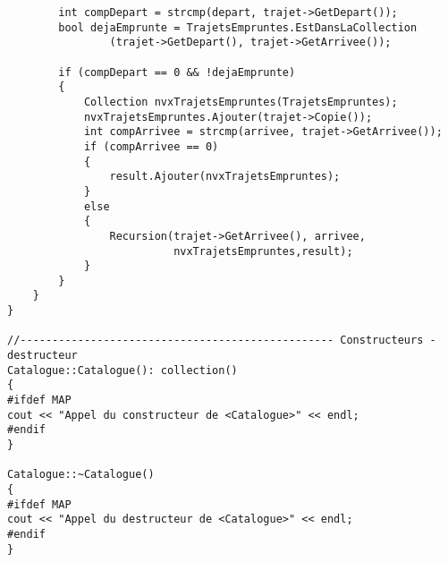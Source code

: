 \begin{verbatim}
        int compDepart = strcmp(depart, trajet->GetDepart());
        bool dejaEmprunte = TrajetsEmpruntes.EstDansLaCollection
                (trajet->GetDepart(), trajet->GetArrivee());
        
        if (compDepart == 0 && !dejaEmprunte)
        {
            Collection nvxTrajetsEmpruntes(TrajetsEmpruntes);
            nvxTrajetsEmpruntes.Ajouter(trajet->Copie());
            int compArrivee = strcmp(arrivee, trajet->GetArrivee());
            if (compArrivee == 0)
            {
                result.Ajouter(nvxTrajetsEmpruntes);
            }
            else
            {
                Recursion(trajet->GetArrivee(), arrivee,
                          nvxTrajetsEmpruntes,result);
            }
        }
    }
}

//------------------------------------------------- Constructeurs - destructeur
Catalogue::Catalogue(): collection()
{
#ifdef MAP
cout << "Appel du constructeur de <Catalogue>" << endl;
#endif
}

Catalogue::~Catalogue()
{
#ifdef MAP
cout << "Appel du destructeur de <Catalogue>" << endl;
#endif
}
\end{verbatim}
